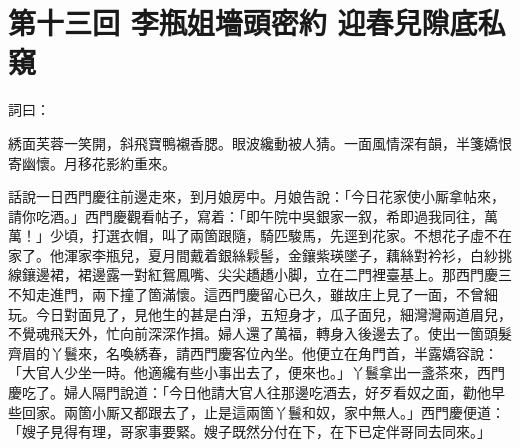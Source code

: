 
\chapter*{第十三回 李瓶姐墻頭密約 迎春兒隙底私窺}


詞曰：

\begin{myquote}
綉面芙蓉一笑開，斜飛寶鴨襯香腮。眼波纔動被人猜。一面風情深有韻，半箋嬌恨寄幽懷。月移花影約重來。

\end{myquote}

話說一日西門慶往前邊走來，到月娘房中。月娘告說：「今日花家使小厮拿帖來，請你吃酒。」西門慶觀看帖子，寫着：「即午院中吳銀家一叙，希即過我同往，萬萬！」少頃，打選衣帽，叫了兩箇跟隨，騎匹駿馬，先逕到花家。不想花子虛不在家了。他渾家李瓶兒，夏月間戴着銀絲鬏髻，金鑲紫瑛墜子，藕絲對衿衫，白紗挑線鑲邊裙，裙邊露一對紅鴛鳳嘴、尖尖趫趫小脚，立在二門裡臺基上。那西門慶三不知走進門，兩下撞了箇滿懷。{}這西門慶留心已久，雖故庄上見了一面，不曾細玩。今日對面見了，見他生的甚是白淨，五短身才，瓜子面兒，細灣灣兩道眉兒，不覺魂飛天外，忙向前深深作揖。婦人還了萬福，轉身入後邊去了。使出一箇頭髮齊眉的丫鬟來，名喚綉春，請西門慶客位內坐。他便立在角門首，半露嬌容說：「大官人少坐一時。他適纔有些小事出去了，便來也。」丫鬟拿出一盞茶來，西門慶吃了。婦人隔門說道：「今日他請大官人往那邊吃酒去，好歹看奴之面，{}勸他早些回家。兩箇小厮又都跟去了，止是這兩箇丫鬟和奴，家中無人。」{}西門慶便道：「嫂子見得有理，哥家事要緊。嫂子既然分付在下，在下已定伴哥同去同來。」


